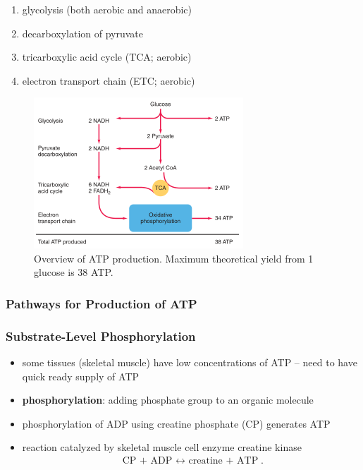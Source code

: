\documentclass[10pt]{article}
\begin{document}
\begin{itemize}
\begin{enumerate}
            \item glycolysis (both aerobic and anaerobic)
            \item decarboxylation of pyruvate
            \item tricarboxylic acid cycle (TCA; aerobic)
            \item electron transport chain (ETC; aerobic)
        \end{enumerate}
        \begin{figure}[h]
            \centering
            \includegraphics[width=0.7\textwidth]{ATPProductionOverview}
            \caption{Overview of ATP production. Maximum theoretical yield from 1 glucose is 38 ATP.}
            \label{fig:ATPProductionOverview}
        \end{figure}
\end{itemize}

\subsubsection{Pathways for Production of ATP}
\subsubsection*{Substrate-Level Phosphorylation}
\begin{itemize}
    \item some tissues (skeletal muscle) have low concentrations of ATP -- need to have quick ready supply of ATP
    \item \textbf{phosphorylation}: adding phosphate group to an organic molecule
    \item phosphorylation of ADP using creatine phosphate (CP) generates ATP
    \item reaction catalyzed by skeletal muscle cell enzyme creatine kinase
        \begin{align*}
            \text{CP + ADP $\longleftrightarrow$ creatine + ATP}
        .\end{align*}
\end{itemize}
\end{document}
